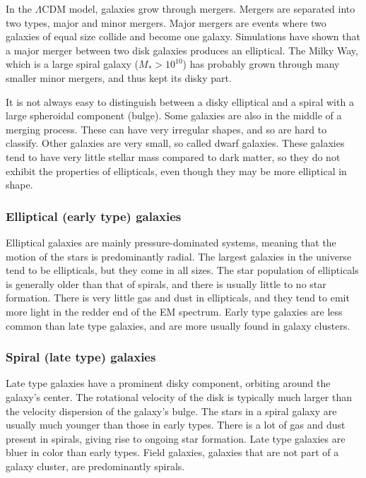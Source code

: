 In the $\Lambda$CDM model, galaxies grow through mergers. Mergers are separated into two types, major and minor mergers.  Major mergers are events where two galaxies of equal size collide and become one galaxy. Simulations have shown that a major merger between two disk galaxies produces an elliptical. The Milky Way, which is a large spiral galaxy ($M_*>10^{10}$) has probably grown through many smaller minor mergers, and thus kept its disky part.

It is not always easy to distinguish between a disky elliptical and a spiral with a large spheroidal component (bulge). Some galaxies are also in the middle of a merging process. These can have very irregular shapes, and so are hard to classify. Other galaxies are very small, so called dwarf galaxies. These galaxies tend to have very little stellar mass compared to dark matter, so they do not exhibit the properties of ellipticals, even though they may be more elliptical in shape.

\subsubsection{Elliptical (early type) galaxies}
Elliptical galaxies are mainly pressure-dominated systems, meaning that the motion of the stars is predominantly radial. The largest galaxies in the universe tend to be ellipticals, but they come in all sizes. The star population of ellipticals is generally older than that of spirals, and there is usually little to no star formation. There is very little gas and dust in ellipticals, and they tend to emit more light in the redder end of the EM spectrum. Early type galaxies are less common than late type galaxies, and are more usually found in galaxy clusters.

\subsubsection{Spiral (late type) galaxies} \label{earlies}
Late type galaxies have a prominent disky component, orbiting around the galaxy's center. The rotational velocity of the disk is typically much larger than the velocity dispersion of the galaxy's bulge. The stars in a spiral galaxy are usually much younger than those in early types. There is a lot of gas and dust present in spirals, giving rise to ongoing star formation. Late type galaxies are bluer in color than early types. Field galaxies, galaxies that are not part of a galaxy cluster, are predominantly spirals. 


